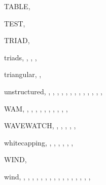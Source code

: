 \documentclass[12pt]{book}
\begin{document}
\begin{theindex}
  \indexspace

  \item TABLE, 
  \item TEST, 
  \item TRIAD, 
  \item triads, , , , 
  \item triangular, , 

  \indexspace

  \item unstructured, , , 
		, , , 
		, , , 
		, , , 
		, , 

  \indexspace

  \item WAM, , , , 
		, , , 
		, , , 
		, 
  \item WAVEWATCH, , , , 
		, , 
  \item whitecapping, , , , 
		, , , 
  \item WIND, 
  \item wind, , , , 
		, , , 
		, , , 
		, , , 
		, , , 
		, 

\end{theindex}
\end{document}
